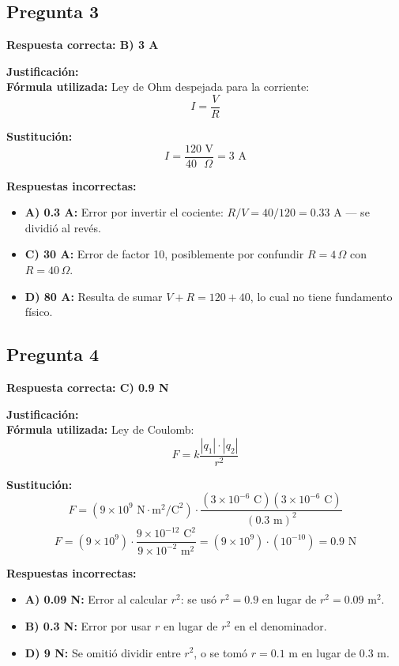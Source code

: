 \begin{respuestabox}
\subsection*{Pregunta 3}
\textcolor{verdecorrecto}{\textbf{Respuesta correcta: B) 3 A}}

\textbf{Justificación:}\\
\textbf{Fórmula utilizada:} Ley de Ohm despejada para la corriente:
$$I = \frac{V}{R}$$

\textbf{Sustitución:}
$$I = \frac{120 \text{ V}}{40 \text{ }\Omega} = 3 \text{ A}$$

\textbf{Respuestas incorrectas:}
\begin{itemize}
    \item \textbf{A) 0.3 A:} Error por invertir el cociente: $R/V = 40/120 = 0.33$ A — se dividió al revés.
    \item \textbf{C) 30 A:} Error de factor 10, posiblemente por confundir $R = 4\,\Omega$ con $R = 40\,\Omega$.
    \item \textbf{D) 80 A:} Resulta de sumar $V + R = 120 + 40$, lo cual no tiene fundamento físico.
\end{itemize}
\end{respuestabox}

\begin{respuestabox}
\subsection*{Pregunta 4}
\textcolor{verdecorrecto}{\textbf{Respuesta correcta: C) 0.9 N}}

\textbf{Justificación:}\\
\textbf{Fórmula utilizada:} Ley de Coulomb:
$$F = k \frac{|q_1| \cdot |q_2|}{r^2}$$

\textbf{Sustitución:}
$$F = (9 \times 10^9 \text{ N}\cdot\text{m}^2/\text{C}^2) \cdot \frac{(3 \times 10^{-6} \text{ C})(3 \times 10^{-6} \text{ C})}{(0.3 \text{ m})^2}$$
$$F = (9 \times 10^9) \cdot \frac{9 \times 10^{-12} \text{ C}^2}{9 \times 10^{-2} \text{ m}^2} = (9 \times 10^9) \cdot (10^{-10}) = 0.9 \text{ N}$$

\textbf{Respuestas incorrectas:}
\begin{itemize}
    \item \textbf{A) 0.09 N:} Error al calcular $r^2$: se usó $r^2 = 0.9$ en lugar de $r^2 = 0.09$ m$^2$.
    \item \textbf{B) 0.3 N:} Error por usar $r$ en lugar de $r^2$ en el denominador.
    \item \textbf{D) 9 N:} Se omitió dividir entre $r^2$, o se tomó $r = 0.1$ m en lugar de 0.3 m.
\end{itemize}
\end{respuestabox}

